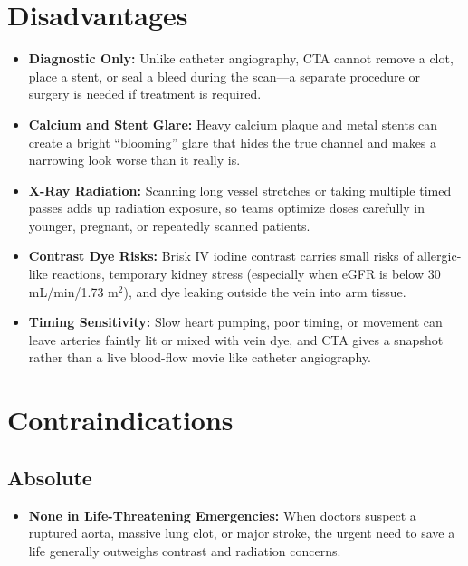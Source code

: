 \section{Disadvantages}
\begin{itemize}
    \item \textbf{Diagnostic Only:} Unlike catheter angiography, CTA cannot remove a clot, place a stent, or seal a bleed during the scan---a separate procedure or surgery is needed if treatment is required.
    \item \textbf{Calcium and Stent Glare:} Heavy calcium plaque and metal stents can create a bright ``blooming'' glare that hides the true channel and makes a narrowing look worse than it really is.
    \item \textbf{X-Ray Radiation:} Scanning long vessel stretches or taking multiple timed passes adds up radiation exposure, so teams optimize doses carefully in younger, pregnant, or repeatedly scanned patients.
    \item \textbf{Contrast Dye Risks:} Brisk IV iodine contrast carries small risks of allergic-like reactions, temporary kidney stress (especially when eGFR is below 30 mL/min/1.73 m$^2$), and dye leaking outside the vein into arm tissue.
    \item \textbf{Timing Sensitivity:} Slow heart pumping, poor timing, or movement can leave arteries faintly lit or mixed with vein dye, and CTA gives a snapshot rather than a live blood-flow movie like catheter angiography.
\end{itemize}

\section{Contraindications}

\subsection{Absolute}
\begin{itemize}
    \item \textbf{None in Life-Threatening Emergencies:} When doctors suspect a ruptured aorta, massive lung clot, or major stroke, the urgent need to save a life generally outweighs contrast and radiation concerns.
\end{itemize}

